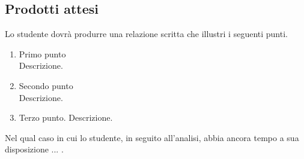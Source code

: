 
\subsection{Prodotti attesi}
	Lo studente dovrà produrre una relazione scritta che illustri i seguenti punti.
	\begin{enumerate}
	    \item Primo punto \\
	    Descrizione. 
	    
	    \item Secondo punto \\
	    Descrizione.
	    
	    \item Terzo punto.
	    Descrizione.
	\end{enumerate}
	
	Nel qual caso in cui lo studente, in seguito all'analisi, abbia ancora tempo a sua disposizione ... .
